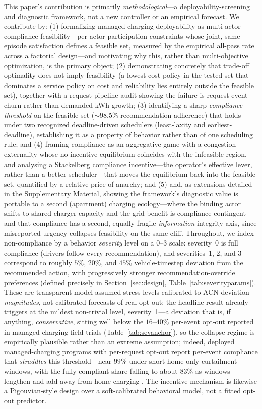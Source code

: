 \documentclass[12pt]{article}
\begin{document}
This paper's contribution is primarily \emph{methodological}---a deployability-screening and diagnostic framework, not a new controller or an empirical forecast. We contribute by: (1) formalizing managed-charging deployability as multi-actor compliance feasibility---per-actor participation constraints whose joint, same-episode satisfaction defines a feasible set, measured by the empirical all-pass rate across a factorial design---and motivating why this, rather than multi-objective optimization, is the primary object; (2) demonstrating concretely that trade-off optimality does not imply feasibility (a lowest-cost policy in the tested set that dominates a service policy on cost and reliability lies entirely outside the feasible set), together with a request-pipeline audit showing the failure is request-event churn rather than demanded-kWh growth; (3) identifying a sharp \emph{compliance threshold} on the feasible set ($\sim$98.5\% recommendation adherence) that holds under two recognized deadline-driven schedulers (least-laxity and earliest-deadline), establishing it as a property of behavior rather than of one scheduling rule; and (4) framing compliance as an aggregative game with a congestion externality whose no-incentive equilibrium coincides with the infeasible region, and analysing a Stackelberg compliance incentive---the operator's effective lever, rather than a better scheduler---that moves the equilibrium back into the feasible set, quantified by a relative price of anarchy; and (5) and, as extensions detailed in the Supplementary Material, showing the framework's diagnostic value is portable to a second (apartment) charging ecology---where the binding actor shifts to shared-charger capacity and the grid benefit is compliance-contingent---and that compliance has a second, equally-fragile \emph{information}-integrity axis, since misreported urgency collapses feasibility on the same cliff. Throughout, we index non-compliance by a behavior \emph{severity} level on a $0$--$3$ scale: severity~0 is full compliance (drivers follow every recommendation), and severities~1, 2, and 3 correspond to roughly $5\%$, $20\%$, and $45\%$ vehicle-timestep deviation from the recommended action, with progressively stronger recommendation-override preferences (defined precisely in Section~\ref{sec:design}, Table~\ref{tab:severityparams}). These are transparent model-assumed stress levels calibrated to ACN deviation \emph{magnitudes}, not calibrated forecasts of real opt-out; the headline result already triggers at the mildest non-trivial level, severity~1---a deviation that is, if anything, \emph{conservative}, sitting well below the $16$--$40\%$ per-event opt-out reported in managed-charging field trials (Table~\ref{tab:sevanchor}), so the collapse regime is empirically plausible rather than an extreme assumption; indeed, deployed managed-charging programs with per-request opt-out report per-event compliance that \emph{straddles} this threshold---near $99\%$ under short home-only curtailment windows, with the fully-compliant share falling to about $83\%$ as windows lengthen and add away-from-home charging \cite{bmwchargeforward}. The incentive mechanism is likewise a Pigouvian-style design over a soft-calibrated behavioral model, not a fitted opt-out predictor.
\end{document}
